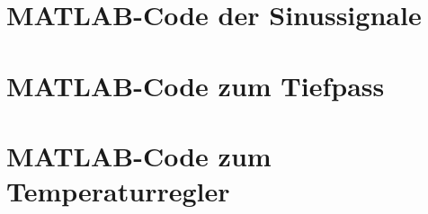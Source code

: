 \documentclass[
    paper=a4,
    fontsize=10pt,
    DIV=13,
    oneside,
]{scrartcl}
\begin{document}

\appendix

\section{MATLAB-Code der Sinussignale}
    

\section{MATLAB-Code zum Tiefpass}
    

\section{MATLAB-Code zum Temperaturregler}
    
\end{document}
